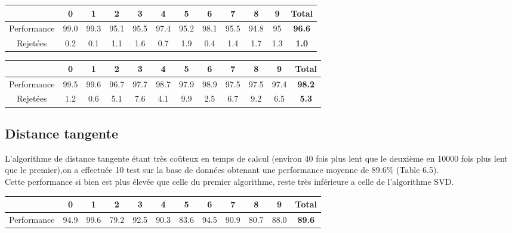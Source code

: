 \documentclass[a4paper,11pt,twoside]{report}
\begin{document}
\begin{center}
\begin{tabular}{ |c||c|c|c|c|c|c|c|c|c|c|c| } 
 \hline
   & 0 & 1 & 2 & 3 & 4 & 5 & 6 & 7 & 8 & 9 & \textbf{Total} \\ 
  \hline
  \hline
 Performance & 99.0 & 99.3 & 95.1 & 95.5 & 97.4 & 95.2 & 98.1 & 95.5 & 94.8 & 95 &  \textbf{96.6} \\
  \hline
 Rejetées & 0.2 & 0.1 & 1.1 & 1.6 & 0.7 & 1.9 & 0.4 & 1.4 & 1.7 & 1.3 & \textbf{1.0} \\
 \hline
\end{tabular}
\end{center}


\begin{center}
\begin{tabular}{ |c||c|c|c|c|c|c|c|c|c|c|c| } 
 \hline
   & 0 & 1 & 2 & 3 & 4 & 5 & 6 & 7 & 8 & 9 & \textbf{Total} \\ 
  \hline
  \hline
 Performance & 99.5 & 99.6 & 96.7 & 97.7 & 98.7 & 97.9 & 98.9 & 97.5 & 97.5 & 97.4 &  \textbf{98.2} \\
  \hline
 Rejetées & 1.2 & 0.6 & 5.1 & 7.6 & 4.1 & 9.9 & 2.5 & 6.7 & 9.2 & 6.5 & \textbf{5.3} \\
 \hline
\end{tabular}
\end{center}

\subsection{Distance tangente}
L’algorithme de distance tangente étant très coûteux en temps de calcul (environ 40 fois plus lent que le deuxième en 10000 fois plus lent que le premier),on a effectuée 10 test sur la base de données obtenant une performance moyenne de 89.6\% (Table 6.5).\\
Cette performance si bien est plus élevée que celle du premier algorithme, reste très inférieure a celle de l'algorithme SVD. 

\begin{center}
\begin{tabular}{ |c||c|c|c|c|c|c|c|c|c|c|c| } 
 \hline
   & 0 & 1 & 2 & 3 & 4 & 5 & 6 & 7 & 8 & 9 & \textbf{Total} \\ 
  \hline
  \hline
 Performance & 94.9 & 99.6 & 79.2 & 92.5 & 90.3 & 83.6 & 94.5 & 90.9 & 80.7 & 88.0 &  \textbf{89.6} \\

 \hline
\end{tabular}
\end{center}
\end{document}
